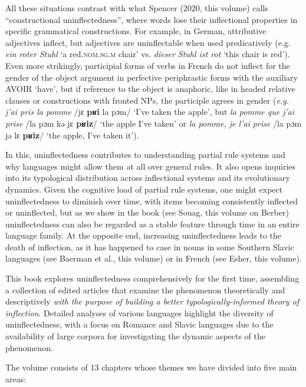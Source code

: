 \documentclass[output=paper]{langscibook}
\begin{document}
All these situations contrast with what Spencer (2020, this volume) calls ``constructional uninflectedness'', where words lose their inflectional properties in specific grammatical constructions. For example, in German, attributive adjectives inflect, but adjectives are uninflectable when used predicatively (e.g. \emph{ein roter Stuhl} `a red.\textsc{nom.sg.m} chair' vs. \emph{dieser Stuhl ist rot} `this chair is red'). Even more strikingly, participial forms of verbs in French do not inflect for the gender of the object argument in perfective periphrastic forms with the auxiliary AVOIR `have', but if reference to
the object is anaphoric, like in headed relative clauses or constructions with fronted NPs, the participle agrees in gender (\emph{e.g. j'ai pris la pomme} /jɛ \textbf{pʁi} la pɔm/ `I've taken the apple', but \emph{la pomme que j'ai prise} /la pɔm kə jɛ \textbf{pʁiz}/ `the apple I've taken' or \emph{la pomme, je l'ai prise} /la pɔm jə lɛ \textbf{pʁiz}/ `the apple, I've taken it').

In this, uninflectedness contributes to understanding partial rule systems \citep{spencer2020} and why languages might allow them at all over general rules. It also opens inquiries into its typological distribution across inflectional systems and its evolutionary dynamics. Given the cognitive load of partial rule systems, one might expect uninflectedness to diminish over time, with items becoming consistently inflected or uninflected, but as we show in the book (see Souag, this volume on Berber) uninflectedness can also be regarded as a stable feature through time in an entire language family. At the opposite end, increasing uninflectedness leads to the death of inflection, as it has happened to case in nouns in some Southern Slavic languages (see Baerman et al., this volume) or in French (see Esher, this volume).

This book explores uninflectedness comprehensively for the first time, assembling a collection of edited articles that examine the phenomenon theoretically and descriptively \emph{with the purpose of building a better typologically-informed theory of inflection}. Detailed analyses of various languages highlight the diversity of uninflectedness, with a focus on Romance and Slavic languages due to the availability of large corpora for investigating the dynamic aspects of the phenomenon.

The volume consists of 13 chapters whose themes we have divided into five main areas:

\medskip
\end{document}
